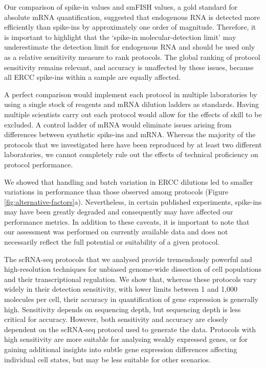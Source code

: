 Our comparison of spike-in values and smFISH values, a gold standard for absolute mRNA quantification, suggested that endogenous RNA is detected more efficiently than spike-ins by approximately one order of magnitude. Therefore, it is important to highlight that the ‘spike-in molecular-detection limit’ may underestimate the detection limit for endogenous RNA and should be used only as a relative sensitivity measure to rank protocols. The global ranking of protocol sensitivity remains relevant, and accuracy is unaffected by these issues, because all ERCC spike-ins within a sample are equally affected.

A perfect comparison would implement each protocol in multiple laboratories by using a single stock of reagents and mRNA dilution ladders as standards. Having multiple scientists carry out each protocol would allow for the effects of skill to be excluded. A control ladder of mRNA would eliminate issues arising from differences between synthetic spike-ins and mRNA. Whereas the majority of the protocols that we investigated here have been reproduced by at least two different laboratories, we cannot completely rule out the effects of technical proficiency on protocol performance.

We showed that handling and batch variation in ERCC dilutions led to smaller variations in performance than those observed among protocols (Figure \ref{fig:alternative-factors}a). Nevertheless, in certain published experiments, spike-ins may have been greatly degraded and consequently may have affected our performance metrics. In addition to these caveats, it is important to note that our assessment was performed on currently available data and does not necessarily reflect the full potential or suitability of a given protocol.

The scRNA-seq protocols that we analysed provide tremendously powerful and high-resolution techniques for unbiased genome-wide dissection of cell populations and their transcriptional regulation. We show that, whereas these protocols vary widely in their detection sensitivity, with lower limits between 1 and 1,000 molecules per cell, their accuracy in quantification of gene expression is generally high. Sensitivity depends on sequencing depth, but sequencing depth is less critical for accuracy. However, both sensitivity and accuracy are closely dependent on the scRNA-seq protocol used to generate the data. Protocols with high sensitivity are more suitable for analysing weakly expressed genes, or for gaining additional insights into subtle gene expression differences affecting individual cell states, but may be less suitable for other scenarios.

